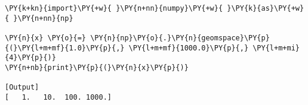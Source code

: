 \begin{Verbatim}[label=\makebox{\href{https://github.com/unipi-physics-labs/statnotes/tree/main/snippy/np.geomspace.py}{https://github.com/.../np.geomspace.py}},commandchars=\\\{\}]
\PY{k+kn}{import}\PY{+w}{ }\PY{n+nn}{numpy}\PY{+w}{ }\PY{k}{as}\PY{+w}{ }\PY{n+nn}{np}

\PY{n}{x} \PY{o}{=} \PY{n}{np}\PY{o}{.}\PY{n}{geomspace}\PY{p}{(}\PY{l+m+mf}{1.0}\PY{p}{,} \PY{l+m+mf}{1000.0}\PY{p}{,} \PY{l+m+mi}{4}\PY{p}{)}
\PY{n+nb}{print}\PY{p}{(}\PY{n}{x}\PY{p}{)}

[Output]
[   1.   10.  100. 1000.]
\end{Verbatim}
